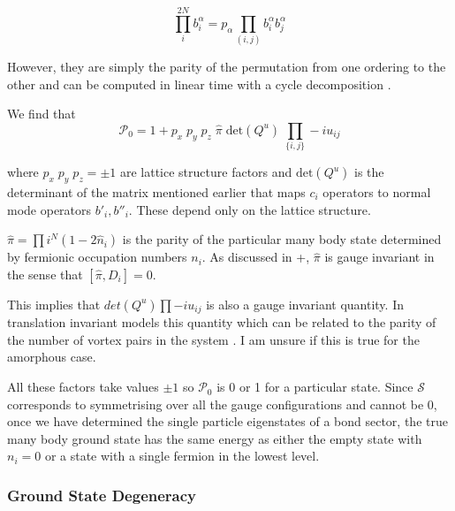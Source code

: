 \[\prod_i^{2N} b^\alpha_i = p_\alpha \prod_{(i,j)}b^\alpha_i b^\alpha_j\]

However, they are simply the parity of the permutation from one ordering to the other and can be computed in linear time with a cycle decomposition \textcite{app:cycle_decomp}.

We find that \[\mathcal{P}_0 = 1 + p_x\;p_y\;p_z\; \hat{\pi} \; \mathrm{det}(Q^u) \; \prod_{\{i,j\}} -iu_{ij}\]

where \(p_x\;p_y\;p_z = \pm 1\) are lattice structure factors and \(\mathrm{det}(Q^u)\) is the determinant of the matrix mentioned earlier that maps \(c_i\) operators to normal mode operators \(b'_i, b''_i\). These depend only on the lattice structure.

\(\hat{\pi} = \prod{i}^{N} (1 - 2\hat{n}_i)\) is the parity of the particular many body state determined by fermionic occupation numbers \(n_i\). As discussed in +\textcite{pedrocchiPhysicalSolutionsKitaev2011b}, \(\hat{\pi}\) is gauge invariant in the sense that \([\hat{\pi}, D_i] = 0\).

This implies that \(det(Q^u) \prod -i u_{ij}\) is also a gauge invariant quantity. In translation invariant models this quantity which can be related to the parity of the number of vortex pairs in the system \textcite{yaoAlgebraicSpinLiquid2009}. I am unsure if this is true for the amorphous case.

All these factors take values \(\pm 1\) so \(\mathcal{P}_0\) is 0 or 1 for a particular state. Since \(\mathcal{S}\) corresponds to symmetrising over all the gauge configurations and cannot be 0, once we have determined the single particle eigenstates of a bond sector, the true many body ground state has the same energy as either the empty state with \(n_i = 0\) or a state with a single fermion in the lowest level.

\hypertarget{ground-state-degeneracy}{%
\subsubsection{Ground State Degeneracy}\label{ground-state-degeneracy}}

